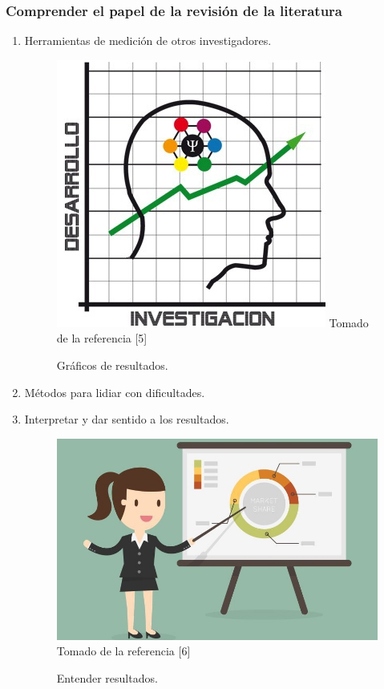 \documentclass{beamer}
\newcounter{sauvegardeenumi}
\newcommand{\asuivre}{\setcounter{sauvegardeenumi}{\theenumi}}
\newcommand{\suite}{\setcounter{enumi}{\thesauvegardeenumi}}
\begin{document}
     \begin{frame}
        \frametitle{Comprender el papel de la revisi\'on de la literatura} 
        \begin{multicols}{2}
            \begin{enumerate}
                \suite
                \item Herramientas de medici\'on de otros investigadores.
                \begin{figure}
                    \includegraphics[scale=0.40]{figures/medicion}
                    \newline
                    {\tiny Tomado de la referencia [5] }
                    \caption{Gr\'aficos de resultados. }
                \end{figure}

                \item M\'etodos para lidiar con dificultades.
                \item Interpretar y dar sentido a los resultados.
                    \begin{figure}
                        \includegraphics[scale=0.60]{figures/resultsOriented}
                        \newline
                        {\tiny Tomado de la referencia [6] }
                        \caption{Entender resultados.}
                    \end{figure}
                    \asuivre
            \end{enumerate}
        \end{multicols}
    \end{frame}
\end{document}
